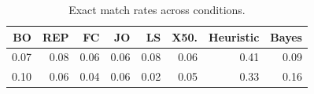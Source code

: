 \begin{table}
\centering
\caption{Exact match rates across conditions.}
\centering
\fontsize{10}{12}\selectfont
\begin{tabular}[t]{rrrrrrrr}
\toprule
BO & REP & FC & JO & LS & X50. & Heuristic & Bayes\\
\midrule
0.07 & 0.08 & 0.06 & 0.06 & 0.08 & 0.06 & 0.41 & 0.09\\
0.10 & 0.06 & 0.04 & 0.06 & 0.02 & 0.05 & 0.33 & 0.16\\
\bottomrule
\end{tabular}
\end{table}
